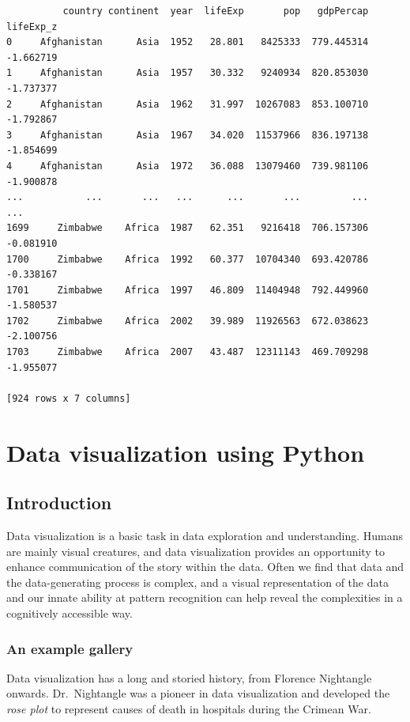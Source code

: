 \documentclass[
  letterpaper,
]{scrbook}
\begin{document}
\begin{verbatim}
          country continent  year  lifeExp       pop   gdpPercap  lifeExp_z
0     Afghanistan      Asia  1952   28.801   8425333  779.445314  -1.662719
1     Afghanistan      Asia  1957   30.332   9240934  820.853030  -1.737377
2     Afghanistan      Asia  1962   31.997  10267083  853.100710  -1.792867
3     Afghanistan      Asia  1967   34.020  11537966  836.197138  -1.854699
4     Afghanistan      Asia  1972   36.088  13079460  739.981106  -1.900878
...           ...       ...   ...      ...       ...         ...        ...
1699     Zimbabwe    Africa  1987   62.351   9216418  706.157306  -0.081910
1700     Zimbabwe    Africa  1992   60.377  10704340  693.420786  -0.338167
1701     Zimbabwe    Africa  1997   46.809  11404948  792.449960  -1.580537
1702     Zimbabwe    Africa  2002   39.989  11926563  672.038623  -2.100756
1703     Zimbabwe    Africa  2007   43.487  12311143  469.709298  -1.955077

[924 rows x 7 columns]
\end{verbatim}

\hypertarget{data-visualization-using-python}{%
\chapter{Data visualization using Python}\label{data-visualization-using-python}}

\hypertarget{introduction}{%
\section{Introduction}\label{introduction}}

Data visualization is a basic task in data exploration and understanding. Humans are mainly visual creatures, and data visualization provides an opportunity to enhance communication of the story within the data. Often we find that data and the data-generating process is complex, and a visual representation of the data and our innate ability at pattern recognition can help reveal the complexities in a cognitively accessible way.

\hypertarget{an-example-gallery}{%
\subsection{An example gallery}\label{an-example-gallery}}

Data visualization has a long and storied history, from Florence Nightangle onwards. Dr.~Nightangle was a pioneer in data visualization and developed the \emph{rose plot} to represent causes of death in hospitals during the Crimean War.
\end{document}
